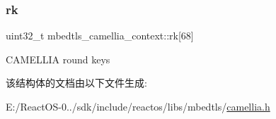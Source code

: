 \subsubsection{\texorpdfstring{rk}{rk}}
{\footnotesize\ttfamily uint32\+\_\+t mbedtls\+\_\+camellia\+\_\+context\+::rk\mbox{[}68\mbox{]}}

C\+A\+M\+E\+L\+L\+IA round keys 

该结构体的文档由以下文件生成\+:\begin{DoxyCompactItemize}
\item 
E\+:/\+React\+O\+S-\/0../sdk/include/reactos/libs/mbedtls/\hyperlink{camellia_8h}{camellia.\+h}\end{DoxyCompactItemize}
